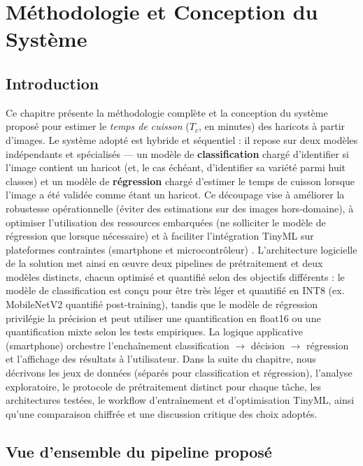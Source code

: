 \chapter{Méthodologie et Conception du Système}
\label{chap:methodologie}

\section{Introduction}
Ce chapitre présente la méthodologie complète et la conception du système proposé pour estimer le \emph{temps de cuisson} (\(T_c\), en minutes) des haricots à partir d'images. Le système adopté est hybride et séquentiel : il repose sur deux modèles indépendants et spécialisés — un modèle de \textbf{classification} chargé d'identifier si l'image contient un haricot (et, le cas échéant, d'identifier sa variété parmi huit classes) et un modèle de \textbf{régression} chargé d'estimer le temps de cuisson lorsque l'image a été validée comme étant un haricot. Ce découpage vise à améliorer la robustesse opérationnelle (éviter des estimations sur des images hors-domaine), à optimiser l'utilisation des ressources embarquées (ne solliciter le modèle de régression que lorsque nécessaire) et à faciliter l'intégration TinyML sur plateformes contraintes (smartphone et microcontrôleur) \cite{warden2019,alirezazadeh2022cascade}.
L'architecture logicielle de la solution met ainsi en œuvre deux pipelines de prétraitement et deux modèles distincts, chacun optimisé et quantifié selon des objectifs différents : le modèle de classification est conçu pour être très léger et quantifié en INT8 (ex. MobileNetV2 quantifié post-training), tandis que le modèle de régression privilégie la précision et peut utiliser une quantification en float16 ou une quantification mixte selon les tests empiriques. La logique applicative (smartphone) orchestre l'enchaînement classification $\rightarrow$ décision $\rightarrow$ régression et l'affichage des résultats à l'utilisateur.
Dans la suite du chapitre, nous décrivons les jeux de données (séparés pour classification et régression), l'analyse exploratoire, le protocole de prétraitement distinct pour chaque tâche, les architectures testées, le workflow d'entraînement et d'optimisation TinyML, ainsi qu'une comparaison chiffrée et une discussion critique des choix adoptés.

\section{Vue d'ensemble du pipeline proposé}

